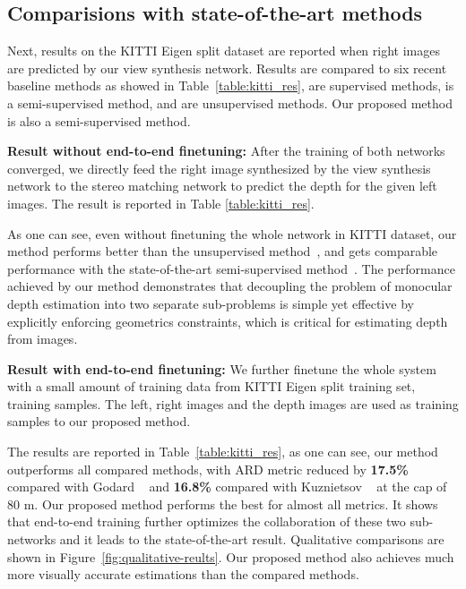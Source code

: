 \documentclass[10pt,twocolumn,letterpaper]{article}
\begin{document}
\subsection{Comparisions with state-of-the-art methods}
Next, results on the KITTI Eigen split dataset are reported when right images are predicted by our view synthesis network. Results are compared to six recent baseline methods as showed in Table~\ref{table:kitti_res}, \cite{eigen2014depth,liu2014discrete}  are supervised methods, \cite{kuznietsov2017semi} is a semi-supervised method, and \cite{godard2016unsupervised,zhou2017unsupervised,garg2016unsupervised} are unsupervised methods. Our proposed method is also a semi-supervised method. 

\textbf{Result without end-to-end finetuning:}
After the training of both networks converged, we directly feed the right image synthesized by the view synthesis network to the stereo matching network to predict the depth for the given left images. The result is reported in Table \ref{table:kitti_res}.  

As one can see, even without finetuning the whole network in KITTI dataset, our method performs better than the unsupervised method~\cite{godard2016unsupervised}, and gets comparable performance with the state-of-the-art semi-supervised method~\cite{kuznietsov2017semi}. The performance achieved by our method demonstrates that decoupling the problem of monocular depth estimation into two separate sub-problems is simple yet effective by explicitly enforcing geometrics constraints, which is critical for estimating depth from images.


\textbf{Result with end-to-end finetuning:}
We further finetune the whole system with a small amount of training data from KITTI Eigen split training set,  training samples. The left, right images and the depth images are used as training samples to our proposed method.

The results are reported in Table~\ref{table:kitti_res}, as one can see, our method outperforms all compared methods, with ARD metric reduced by \textbf{17.5\%} compared with Godard \etal~\cite{godard2016unsupervised} and \textbf{16.8\%} compared with Kuznietsov \etal~\cite{kuznietsov2017semi} at the cap of 80 m. Our proposed method performs the best for almost all metrics. It shows that end-to-end training further optimizes the collaboration of these two sub-networks and it leads to the state-of-the-art result. Qualitative comparisons are shown in Figure~\ref{fig:qualitative-reults}. Our proposed method also achieves much more visually accurate estimations than the compared methods.
\end{document}
